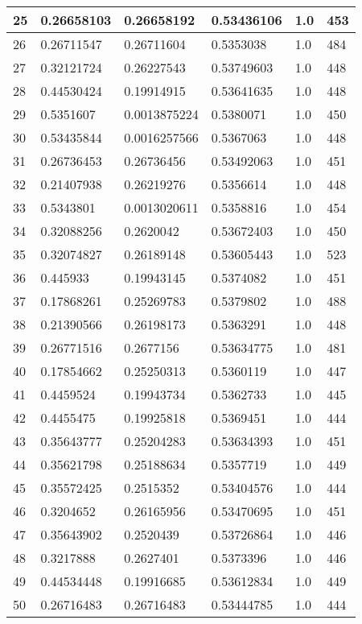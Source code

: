 \begin{longtable}{|l|l|l|l|l|l|}
25 & 0.26658103 & 0.26658192 & 0.53436106 & 1.0 & 453 \\ \hline 
26 & 0.26711547 & 0.26711604 & 0.5353038 & 1.0 & 484 \\ \hline 
27 & 0.32121724 & 0.26227543 & 0.53749603 & 1.0 & 448 \\ \hline 
28 & 0.44530424 & 0.19914915 & 0.53641635 & 1.0 & 448 \\ \hline 
29 & 0.5351607 & 0.0013875224 & 0.5380071 & 1.0 & 450 \\ \hline 
30 & 0.53435844 & 0.0016257566 & 0.5367063 & 1.0 & 448 \\ \hline 
31 & 0.26736453 & 0.26736456 & 0.53492063 & 1.0 & 451 \\ \hline 
32 & 0.21407938 & 0.26219276 & 0.5356614 & 1.0 & 448 \\ \hline 
33 & 0.5343801 & 0.0013020611 & 0.5358816 & 1.0 & 454 \\ \hline 
34 & 0.32088256 & 0.2620042 & 0.53672403 & 1.0 & 450 \\ \hline 
35 & 0.32074827 & 0.26189148 & 0.53605443 & 1.0 & 523 \\ \hline 
36 & 0.445933 & 0.19943145 & 0.5374082 & 1.0 & 451 \\ \hline 
37 & 0.17868261 & 0.25269783 & 0.5379802 & 1.0 & 488 \\ \hline 
38 & 0.21390566 & 0.26198173 & 0.5363291 & 1.0 & 448 \\ \hline 
39 & 0.26771516 & 0.2677156 & 0.53634775 & 1.0 & 481 \\ \hline 
40 & 0.17854662 & 0.25250313 & 0.5360119 & 1.0 & 447 \\ \hline 
41 & 0.4459524 & 0.19943734 & 0.5362733 & 1.0 & 445 \\ \hline 
42 & 0.4455475 & 0.19925818 & 0.5369451 & 1.0 & 444 \\ \hline 
43 & 0.35643777 & 0.25204283 & 0.53634393 & 1.0 & 451 \\ \hline 
44 & 0.35621798 & 0.25188634 & 0.5357719 & 1.0 & 449 \\ \hline 
45 & 0.35572425 & 0.2515352 & 0.53404576 & 1.0 & 444 \\ \hline 
46 & 0.3204652 & 0.26165956 & 0.53470695 & 1.0 & 451 \\ \hline 
47 & 0.35643902 & 0.2520439 & 0.53726864 & 1.0 & 446 \\ \hline 
48 & 0.3217888 & 0.2627401 & 0.5373396 & 1.0 & 446 \\ \hline 
49 & 0.44534448 & 0.19916685 & 0.53612834 & 1.0 & 449 \\ \hline 
50 & 0.26716483 & 0.26716483 & 0.53444785 & 1.0 & 444 \\ \hline 
\end{longtable}